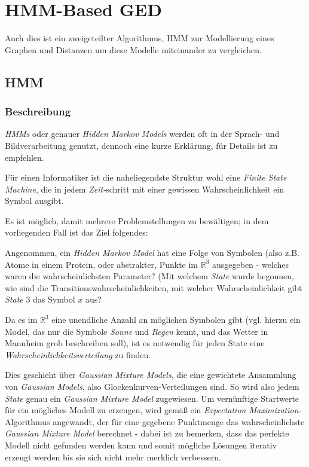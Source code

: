 \documentclass{DEarticle}
\begin{document}
\section{HMM-Based GED}
\cite[HMM-Based GED]{comp}
Auch dies ist ein zweigeteilter Algorithmus, HMM zur Modellierung eines Graphen und Distanzen um diese Modelle
miteinander zu vergleichen.
\subsection{HMM}
\subsubsection{Beschreibung}
\emph{HMMs} oder genauer \emph{Hidden Markov Models} werden oft in der Sprach- und Bildverarbeitung genutzt, dennoch
eine kurze Erklärung, für Details ist \cite{rabin} zu empfehlen.

Für einen Informatiker ist die naheliegendste Struktur wohl eine \emph{Finite State Machine}, die in jedem
\emph{Zeit-}schritt mit einer gewissen Wahrscheinlichkeit ein Symbol ausgibt. 

Es ist möglich, damit mehrere Problemstellungen zu bewältigen; in dem vorliegenden Fall ist das Ziel folgendes: 

Angenommen, ein \emph{Hidden Markov Model} hat eine Folge von Symbolen (also z.B. Atome in einem Protein, oder
abstrakter, Punkte im $\mathbb{R}^3$ ausgegeben - welches waren die wahrscheinlichsten Parameter? (Mit welchem
\emph{State} wurde begonnen, wie sind die Transitionswahrscheinlichkeiten, mit welcher Wahrscheinlichkeit gibt
\emph{State} $3$ das Symbol $x$ aus?

Da es im $\mathbb{R}^3$ eine unendliche Anzahl an möglichen Symbolen gibt (vgl. hierzu ein Model, das nur die
Symbole \emph{Sonne} und \emph{Regen} kennt, und das Wetter in Mannheim grob beschreiben soll), ist es notwendig für
jeden State eine \emph{Wahrscheinlichkeitsverteilung} zu finden.

Dies geschieht über \emph{Gaussian Mixture Models}, die eine gewichtete Ansammlung von \emph{Gaussian
Models}, also Glockenkurven-Verteilungen sind. So wird also jedem \emph{State} genau ein \emph{Gaussian Mixture Model}
zugewiesen.
Um vernünftige Startwerte für ein mögliches Modell zu erzeugen, wird gemäß \cite{comp} ein \cite{emgmm}
\emph{Expectation Maximization}-Algorithmus angewandt, der für eine gegebene Punktmenge das wahrscheinlichste
\emph{Gaussian Mixture Model} berechnet - dabei ist zu bemerken, dass das perfekte Modell nicht gefunden werden kann und
somit mögliche Lösungen iterativ erzeugt werden bis sie sich nicht mehr merklich verbessern.
\end{document}
